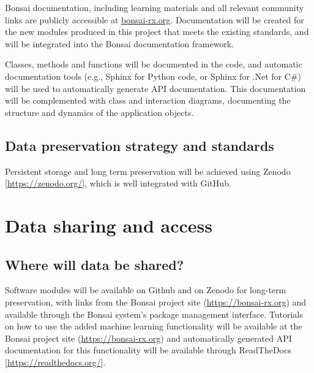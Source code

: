 \documentclass[a4paper,11pt]{article}
\begin{document}
Bonsai documentation, including learning materials and all relevant community
links are publicly accessible at \url{bonsai-rx.org}.
Documentation will be created for the new modules produced in this project that
meets the existing standards, and will be integrated into the Bonsai
documentation framework.

Classes, methods and functions will be documented in the code, and automatic
documentation tools (e.g., Sphinx for Python code, or Sphinx for .Net for C\#)
will be used to automatically generate API documentation. This documentation
will be complemented with class and interaction diagrams, documenting the
structure and dynamics of the application objects.

\subsection{Data preservation strategy and standards}


Persistent storage and long term preservation will be achieved using
Zenodo [\url{https://zenodo.org/}], which is well integrated with
GitHub.



\section{Data sharing and access}
\subsection{Where will data be shared?}
Software modules will be available on Github and on Zenodo for long-term
preservation, with links from the Bonsai project site
(\url{https://bonsai-rx.org}) and available through the Bonsai system's package
management interface. Tutorials on how to use the added machine learning
functionality will be available at the Bonsai project site
(\url{https://bonsai-rx.org}) and automatically generated API documentation for
this functionality will be available through ReadTheDocs [\url{https://readthedocs.org/}].
\end{document}

